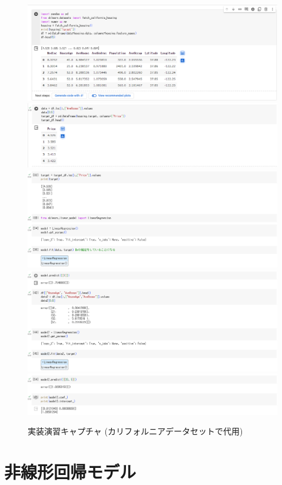 \documentclass{ltjsarticle}
\begin{document}
\begin{figure}[htbp]
  \centering
  \includegraphics[width=12cm]{capture/cap_1.png}
  \includegraphics[width=12cm]{capture/cap_2.png}
  \includegraphics[width=12cm]{capture/cap_3.png}
  \includegraphics[width=12cm]{capture/cap_4.png}
  \includegraphics[width=12cm]{capture/cap_5.png}
  \caption{実装演習キャプチャ (カリフォルニアデータセットで代用)}
\end{figure}

\newpage

\section{非線形回帰モデル}
\end{document}
